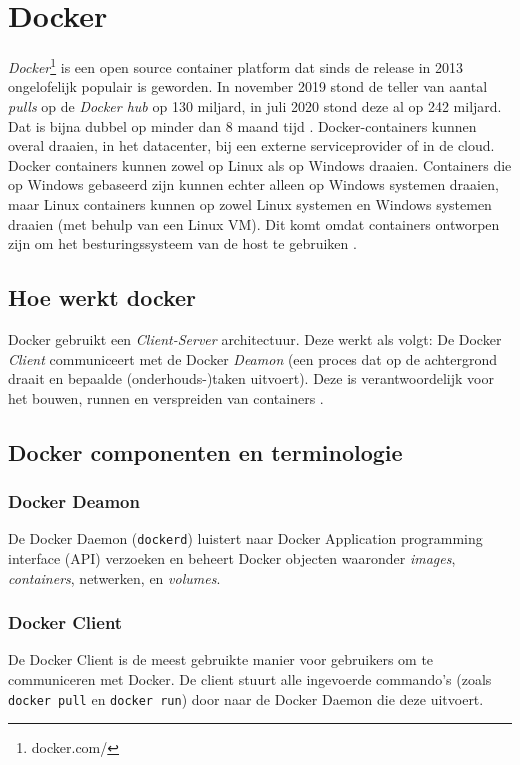 \section{Docker}
\textit{Docker}\footnote{docker.com/} is een open source container platform dat sinds de release in 2013 ongelofelijk populair is geworden. In november 2019 stond de teller van aantal \textit{pulls} op de \textit{Docker hub} op 130 miljard, in juli 2020 stond deze al op 242 miljard. Dat is bijna dubbel op minder dan 8 maand tijd \autocite{Kreisa2020}. Docker-containers kunnen overal draaien, in het datacenter, bij een externe serviceprovider of in de cloud. Docker containers kunnen zowel op Linux als op Windows draaien. Containers die op Windows gebaseerd zijn kunnen echter alleen op Windows systemen draaien, maar Linux containers kunnen op zowel Linux systemen en Windows systemen draaien (met behulp van een Linux VM). Dit komt omdat containers ontworpen zijn om het besturingssysteem van de host te gebruiken \autocite{Anil2018}.


\subsection{Hoe werkt docker}
Docker gebruikt een \textit{Client-Server} architectuur. Deze werkt als volgt: De Docker \textit{Client} communiceert met de Docker \textit{Deamon} (een proces dat op de achtergrond draait en bepaalde (onderhouds-)taken uitvoert). Deze is verantwoordelijk voor het bouwen, runnen en verspreiden van containers \autocite{Docker2021a}.

\subsection{Docker componenten en terminologie}

\subsubsection{Docker Deamon}De Docker Daemon (\verb|dockerd|) luistert naar Docker Application programming interface (API) verzoeken en beheert Docker objecten waaronder \textit{images}, \textit{containers}, netwerken, en \textit{volumes}.

\subsubsection{Docker Client}De Docker Client is de meest gebruikte manier voor gebruikers om te communiceren met Docker. De client stuurt alle ingevoerde commando's (zoals \verb|docker pull| en \verb|docker run|) door naar de Docker Daemon die deze uitvoert.

